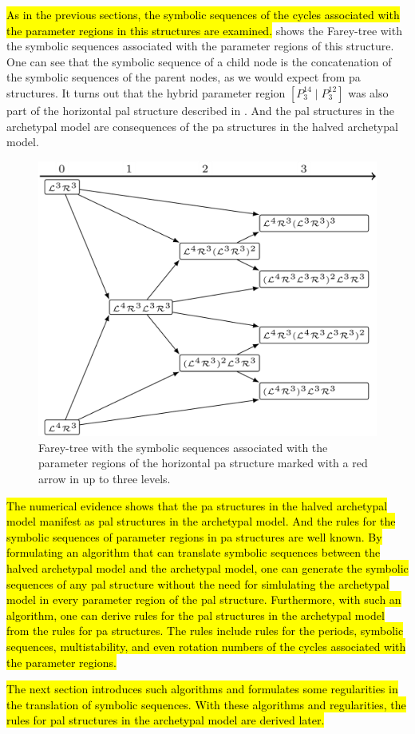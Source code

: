 \hl{
	As in the previous sections, the symbolic sequences of the cycles associated with the parameter regions in this structures are examined.
}
 shows the Farey-tree with the symbolic sequences associated with the parameter regions of this structure.
One can see that the symbolic sequence of a child node is the concatenation of the symbolic sequences of the parent nodes, as we would expect from \gls{pa} structures.
It turns out that the hybrid parameter region $\left[P^{14}_3 \mid P^{12}_3\right]$ was also part of the horizontal \gls{pal} structure described in .
And the \gls{pal} structures in the archetypal model are consequences of the \gls{pa} structures in the halved archetypal model.

\begin{figure}
	\centering
	\includegraphics[width=.7 \textwidth]{../Figures/7/7.20/adding.png}
	\caption[Farey-tree with the symbolic sequences of a horizontal  structure]{
		Farey-tree with the symbolic sequences associated with the parameter regions of the horizontal \gls{pa} structure marked with a red arrow in  up to three levels.
	}
	\label{fig:halved.hor.tree}
\end{figure}

\hl{
	The numerical evidence shows that the \gls{pa} structures in the halved archetypal model manifest as \gls{pal} structures in the archetypal model.
	And the rules for the symbolic sequences of parameter regions in \gls{pa} structures are well known.
	By formulating an algorithm that can translate symbolic sequences between the halved archetypal model and the archetypal model, one can generate the symbolic sequences of any \gls{pal} structure without the need for simlulating the archetypal model in every parameter region of the \gls{pal} structure.
	Furthermore, with such an algorithm, one can derive rules for the \gls{pal} structures in the archetypal model from the rules for \gls{pa} structures.
	The rules include rules for the periods, symbolic sequences, multistability, and even rotation numbers of the cycles associated with the parameter regions.
}

\hl{
	The next section introduces such algorithms and formulates some regularities in the translation of symbolic sequences.
	With these algorithms and regularities, the rules for \gls{pal} structures in the archetypal model are derived later.
}
